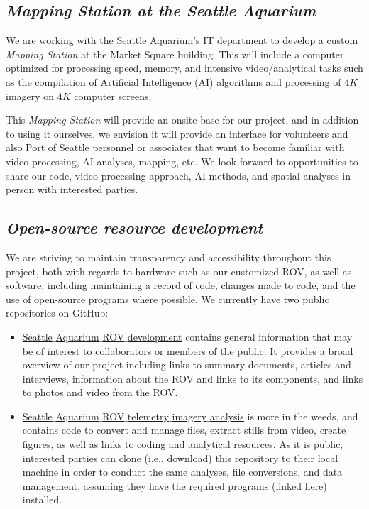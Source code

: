 \documentclass[11pt]{article}
\begin{document}
\subsection{\textit{Mapping Station at the Seattle Aquarium}}
We are working with the Seattle Aquarium's IT department to develop a 
custom \textit{Mapping Station} at the Market Square building. 
This will include a computer optimized for processing speed, memory, 
and intensive video/analytical tasks such as the compilation of 
Artificial Intelligence (AI) algorithms and processing of $4K$ 
imagery on $4K$ computer screens. 

This \textit{Mapping Station} will provide an onsite base for our 
project, and in addition to using it ourselves, we envision it will 
provide an interface for volunteers and also Port of Seattle personnel 
or associates that want to become familiar with video processing, 
AI analyses, mapping, etc. 
We look forward to opportunities to share our code, video processing 
approach, AI methods, and spatial analyses in-person with interested 
parties.

\subsection{\textit{Open-source resource development}}
We are striving to maintain transparency and accessibility throughout 
this project, both with regards to hardware such as our customized ROV, as well as software, including maintaining a record of code, changes made to code, and the use of open-source programs where possible.
We currently have two public repositories on GitHub: 

\begin{itemize}
\item 
\href{https://github.com/zhrandell/Seattle_Aquarium_ROV_development}{Seattle$\_$Aquarium$\_$ROV$\_$development}
contains general information that may be of interest to collaborators 
or members of the public.  
It provides a broad overview of our project including links to summary 
documents, articles and interviews, information about the ROV and links 
to its components, and links to photos and video from the ROV. 
\item
\href{https://github.com/zhrandell/Seattle_Aquarium_ROV_telemetry_imagery_analysis}{Seattle$\_$Aquarium$\_$ROV$\_$telemetry$\_$imagery$\_$analysis}
is more in the weeds, and contains code to convert and manage files, 
extract stills from video, create figures, as well as links to coding 
and analytical resources. 
As it is public, interested parties can clone (i.e., download) this 
repository to their local machine in order to conduct the same 
analyses, file conversions, and data management, assuming they have the 
required programs (linked 
\href{https://github.com/zhrandell/Seattle_Aquarium_ROV_development/blob/main/documents/hardware_software.md#rov-firmware-flight-programs--analytical-software}{here})
 installed.  
\end{itemize}
\end{document}
